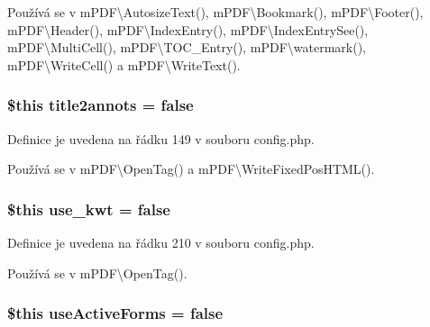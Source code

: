 Používá se v m\-P\-D\-F\textbackslash{}\-Autosize\-Text(), m\-P\-D\-F\textbackslash{}\-Bookmark(), m\-P\-D\-F\textbackslash{}\-Footer(), m\-P\-D\-F\textbackslash{}\-Header(), m\-P\-D\-F\textbackslash{}\-Index\-Entry(), m\-P\-D\-F\textbackslash{}\-Index\-Entry\-See(), m\-P\-D\-F\textbackslash{}\-Multi\-Cell(), m\-P\-D\-F\textbackslash{}\-T\-O\-C\-\_\-\-Entry(), m\-P\-D\-F\textbackslash{}watermark(), m\-P\-D\-F\textbackslash{}\-Write\-Cell() a m\-P\-D\-F\textbackslash{}\-Write\-Text().

\hypertarget{config_8php_a4507dbbf43b6207f3c3030867c5dcb59}{
\subsubsection[{title2annots}]{\setlength{\rightskip}{0pt plus 5cm}\$this title2annots = {\bf false}}}\label{config_8php_a4507dbbf43b6207f3c3030867c5dcb59}


Definice je uvedena na řádku 149 v souboru config.\-php.



Používá se v m\-P\-D\-F\textbackslash{}\-Open\-Tag() a m\-P\-D\-F\textbackslash{}\-Write\-Fixed\-Pos\-H\-T\-M\-L().

\hypertarget{config_8php_a80ec406008a5b3b8d361a17a936b4ace}{
\subsubsection[{use\-\_\-kwt}]{\setlength{\rightskip}{0pt plus 5cm}\$this use\-\_\-kwt = {\bf false}}}\label{config_8php_a80ec406008a5b3b8d361a17a936b4ace}


Definice je uvedena na řádku 210 v souboru config.\-php.



Používá se v m\-P\-D\-F\textbackslash{}\-Open\-Tag().

\hypertarget{config_8php_af55402cb8c041a80acb44b819e344401}{
\subsubsection[{use\-Active\-Forms}]{\setlength{\rightskip}{0pt plus 5cm}\$this use\-Active\-Forms = {\bf false}}}\label{config_8php_af55402cb8c041a80acb44b819e344401}


